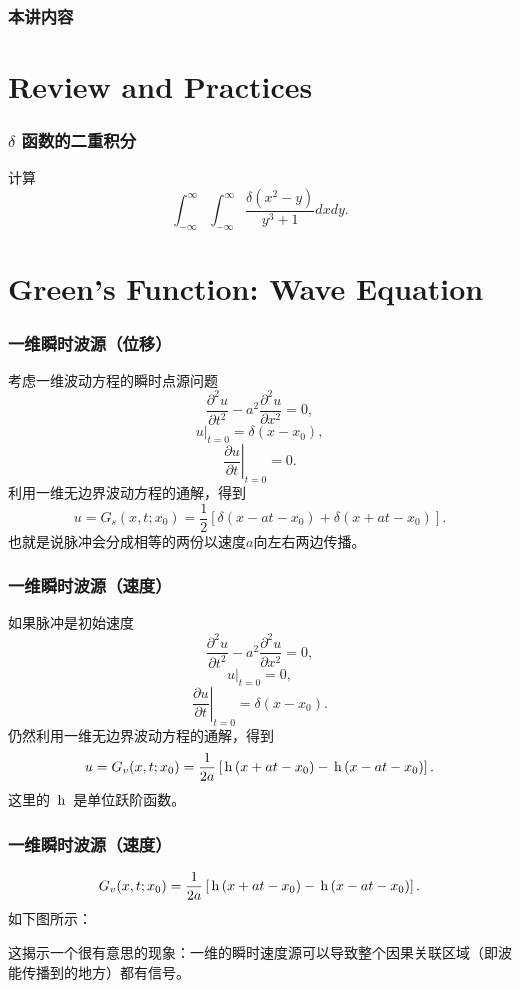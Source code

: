 \documentclass[CJK]{beamer}
\date{}
\begin{document}
  \bch
{}

\begin{frame}
  \frametitle{本讲内容}
  
\tableofcontents

\end{frame}

\section{Review and Practices}


\begin{frame}
  \frametitle{$\delta$ 函数的二重积分}
  计算
  $$\int_{-\infty}^\infty\int_{-\infty}^\infty \frac{\delta(x^2-y)}{y^3+1} dxdy.$$
\end{frame}

\section{Green's Function: Wave Equation}

\begin{frame}
  \frametitle{一维瞬时波源（位移）}
  考虑一维波动方程的瞬时点源问题
  $$\frac{\partial^2u}{\partial t^2}-a^2\frac{\partial^2u }{\partial x^2} = 0, $$
  $$\left. u\right\vert_{t=0} = \delta(x-x_0),$$
  $$\left. \frac{\partial u}{\partial t}\right\vert_{t=0} = 0.$$  
  利用一维无边界波动方程的通解，得到
  $$ u = G_s(x,t;x_0) = \frac{1}{2}\left[\delta(x-at-x_0) + \delta(x+at-x_0)\right].$$
  也就是说脉冲会分成相等的两份以速度$a$向左右两边传播。
\end{frame}

\begin{frame}
  \frametitle{一维瞬时波源（速度）}
  如果脉冲是初始速度
  $$\frac{\partial^2u}{\partial t^2}-a^2\frac{\partial^2u }{\partial x^2} = 0, $$
  $$\left. u\right\vert_{t=0} = 0,$$
  $$\left. \frac{\partial u}{\partial t}\right\vert_{t=0} = \delta(x-x_0).$$  
  仍然利用一维无边界波动方程的通解，得到
  $$ u = G_v(x,t;x_0) = \frac{1}{2a}\left[\,\mathrm{h}\,(x+at-x_0) - \,\mathrm{h}\,(x-at-x_0)\right].$$
  这里的 $ \,\mathrm{h}\,$ 是单位跃阶函数。


\end{frame}

\begin{frame}
  \frametitle{一维瞬时波源（速度）}
  
  $$G_v(x,t;x_0) = \frac{1}{2a}\left[ \,\mathrm{h}\,(x+at-x_0) -  \,\mathrm{h}\,(x-at-x_0)\right].$$
  如下图所示：
  

  这揭示一个很有意思的现象：一维的瞬时速度源可以导致整个因果关联区域（即波能传播到的地方）都有信号。
\end{frame}
\end{document}
